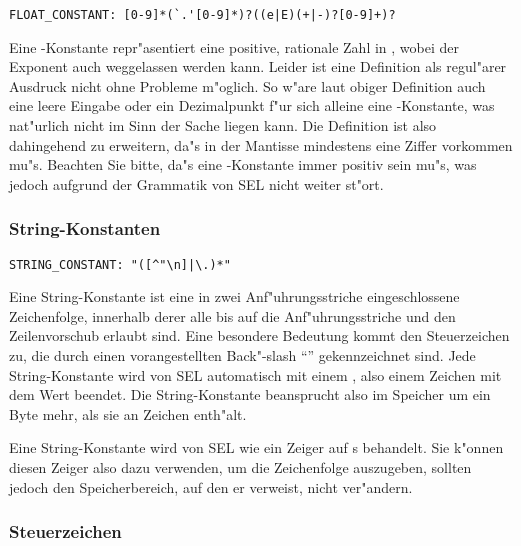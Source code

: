 \begin{verbatim}
FLOAT_CONSTANT: [0-9]*(`.'[0-9]*)?((e|E)(+|-)?[0-9]+)?
\end{verbatim}

Eine \tfloat -Konstante repr"asentiert eine positive, rationale
Zahl in , wobei der Exponent auch
weggelassen werden kann. Leider ist eine Definition als
regul"arer Ausdruck nicht ohne Probleme m"oglich. So w"are laut
obiger Definition auch eine leere Eingabe oder ein Dezimalpunkt
f"ur sich alleine eine \tfloat -Konstante, was nat"urlich nicht
im Sinn der Sache liegen kann. Die Definition ist also
dahingehend zu erweitern, da"s in der Mantisse mindestens eine Ziffer
vorkommen mu"s. Beachten Sie bitte, da"s eine
\tfloat -Konstante immer positiv sein mu"s, was jedoch aufgrund
der Grammatik von SEL nicht weiter st"ort.

\subsubsection{String-Konstanten}

\begin{verbatim}
STRING_CONSTANT: "([^"\n]|\.)*"
\end{verbatim}

Eine String-Konstante ist eine in zwei Anf"uhrungsstriche
eingeschlossene Zeichenfolge, innerhalb derer
alle  bis auf die Anf"uhrungsstriche und den
Zeilenvorschub erlaubt sind. Eine besondere Bedeutung kommt den
Steuerzeichen
zu, die durch einen vorangestellten Back"-slash
"`"'
gekennzeichnet sind. Jede String-Konstante wird
von SEL automatisch mit einem , also einem Zeichen mit
dem Wert  beendet. Die String-Konstante beansprucht also im
Speicher um ein Byte mehr, als sie an Zeichen enth"alt.

Eine String-Konstante wird von SEL wie ein Zeiger auf
\tchar s
behandelt. Sie k"onnen diesen Zeiger also dazu
verwenden, um die Zeichenfolge auszugeben, sollten jedoch den
Speicherbereich, auf den er verweist, nicht ver"andern.

\subsubsection{Steuerzeichen}
\label{specialchar}

